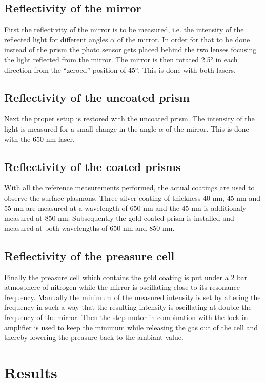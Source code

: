 \documentclass[twoside,english,headsepline=on,DIV=12]{scrartcl}
\numberwithin{equation}{section}
\begin{document}
\subsection{Reflectivity of the mirror}
First the reflectivity of the mirror is to be measured, i.e. the intensity of the reflected light for different angles $\alpha$ of the mirror. In order for that to be done instead of the prism the photo sensor gets placed behind the two lenses focusing the light reflected from the mirror. The mirror is then rotated 2.5° in each direction from the ``zeroed'' position of 45°. This is done with both lasers. 
\subsection{Reflectivity of the uncoated prism}
Next the proper setup is restored with the uncoated prism. The intensity of the light is measured for a small change in the angle $\alpha$ of the mirror. This is done with the 650 nm laser.
\subsection{Reflectivity of the coated prisms}
With all the reference measurements performed, the actual coatings are used to observe the surface plasmons. Three silver coating of thickness 40 nm, 45 nm and 55 nm are measured at a wavelength of 650 nm and the 45 nm is additionaly measured at 850 nm. Subsequently the gold coated prism is installed and measured at both wavelengths of 650 nm and 850 nm. 
\subsection{Reflectivity of the preasure cell}
Finally the preasure cell which contains the gold coating is put under a 2 bar atmosphere of nitrogen while the mirror is oscillating close to its resonance frequency. Manually the minimum of the measured intensity is set by altering the frequency in such a way that the resulting intensity is oscillating at double the frequency of the mirror. Then the step motor in combination with the lock-in amplifier is used to keep the minimum while releasing the gas out of the cell and thereby lowering the preasure back to the ambiant value. 

\section{Results}
\end{document}
